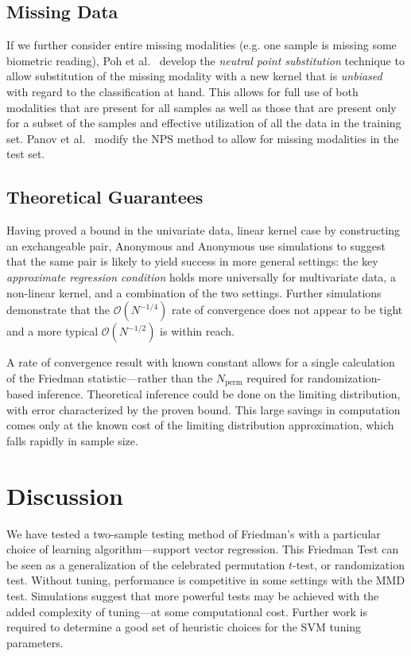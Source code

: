 \subsection{Missing Data}
If we further consider entire missing modalities (e.g. one sample is
missing some biometric reading), Poh et al.\ \cite{poh2010addressing}
develop the \emph{neutral point substitution} technique to allow
substitution of the missing modality with a new kernel that is
\emph{unbiased} with regard to the classification at hand.  This
allows for full use of both modalities that are present for all
samples as well as those that are present only for a subset of the
samples and effective utilization of all the data in the training set.
Panov et al.\ \cite{panov2011modified} modify the NPS method to allow
for missing modalities in the test set.

\subsection{Theoretical Guarantees}
Having proved a bound in the univariate data, linear kernel case by
constructing an exchangeable pair, Anonymous and Anonymous
\cite{rayholmes2012} use simulations to suggest
that the same pair is likely to yield success in more general
settings: the key \emph{approximate regression condition} holds more
universally for multivariate data, a non-linear kernel, and a
combination of the two settings.  Further simulations demonstrate that
the $\mathcal{O}(N^{-1/4})$ rate of convergence does not appear to be
tight and a more typical $\mathcal{O}(N^{-1/2})$ is within reach.  

A rate of convergence result with known constant allows
for a single calculation of the Friedman statistic---rather than the
$N_{\mathrm{perm}}$ required for randomization-based inference.
Theoretical inference could be done on the limiting distribution, with
error characterized by the proven bound.  This large savings in
computation comes only at the known cost of the limiting distribution
approximation, which falls rapidly in sample size.

\section{Discussion}
We have tested a two-sample testing method of Friedman's
\cite{friedman30908multivariate} with a particular choice of learning
algorithm---support vector regression.  This Friedman Test can be seen
as a generalization of the celebrated permutation $t$-test, or
randomization test.  Without tuning, performance is competitive in
some settings with the MMD test.  Simulations suggest that more
powerful tests may be achieved with the added complexity of
tuning---at some computational cost.  Further work is required to
determine a good set of heuristic choices for the SVM tuning parameters.


